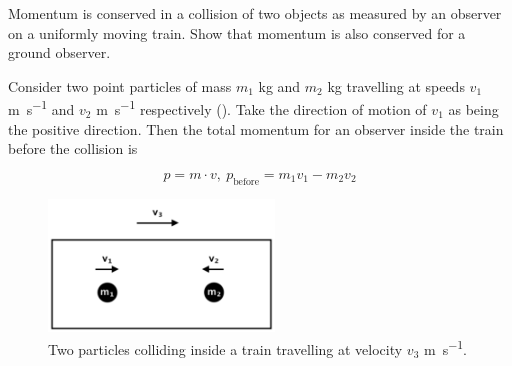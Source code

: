 \begin{question}
  Momentum is conserved in a collision of two objects as measured by an observer on a uniformly moving train. Show that momentum is also conserved for a ground observer.
\end{question}
\begin{solution}
  Consider two point particles of mass $m_1$ \si{kg} and $m_2$ \si{kg} travelling at speeds $v_1$ \si{m.s^{-1}} and $v_2$ \si{m.s^{-1}} respectively (). Take the direction of motion of $v_1$ as being the positive direction. Then the total momentum for an observer inside the train before the collision is

  \begin{equation}
    p = m \cdot v, ~ p_{\text{before}} = m_1 v_1 - m_2 v_2
  \end{equation}

  \begin{figure} \centering
    \includegraphics[width=6cm]{fig/1q2.png}
    \caption{Two particles colliding inside a train travelling at velocity $v_3$ \si{m.s^{-1}}.} \label{fig:1q2}
  \end{figure}
\end{solution}
